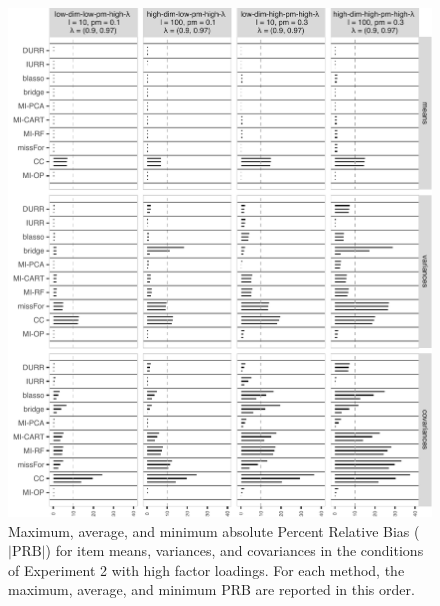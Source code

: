 \begin{figure}
	\includegraphics{../../output/graphs/exp2_semR_bias_14_summy.pdf}
\caption{
	Maximum, average, and minimum absolute Percent Relative Bias ($|\text{PRB}|$) for item means, variances, 
	and covariances in the conditions of Experiment 2 with high factor loadings.
	For each method, the maximum, average, and minimum PRB are reported in this order.	
}
\label{fig:exp2bias14}
\end{figure}


